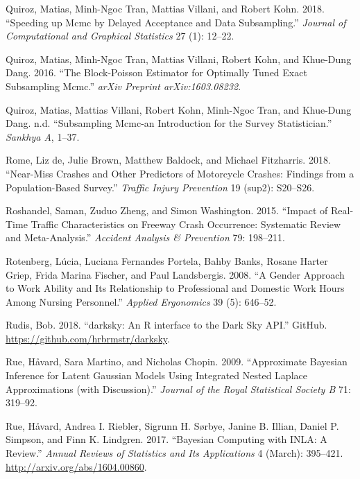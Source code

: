 \documentclass[12pt]{book}
\numberwithin{equation}{chapter}
\begin{document}
\leavevmode\hypertarget{ref-quiroz2018speeding}{}%
Quiroz, Matias, Minh-Ngoc Tran, Mattias Villani, and Robert Kohn. 2018. ``Speeding up Mcmc by Delayed Acceptance and Data Subsampling.'' \emph{Journal of Computational and Graphical Statistics} 27 (1): 12--22.

\leavevmode\hypertarget{ref-quiroz2016block}{}%
Quiroz, Matias, Minh-Ngoc Tran, Mattias Villani, Robert Kohn, and Khue-Dung Dang. 2016. ``The Block-Poisson Estimator for Optimally Tuned Exact Subsampling Mcmc.'' \emph{arXiv Preprint arXiv:1603.08232}.

\leavevmode\hypertarget{ref-quirozsubsampling}{}%
Quiroz, Matias, Mattias Villani, Robert Kohn, Minh-Ngoc Tran, and Khue-Dung Dang. n.d. ``Subsampling Mcmc-an Introduction for the Survey Statistician.'' \emph{Sankhya A}, 1--37.

\leavevmode\hypertarget{ref-de2018near}{}%
Rome, Liz de, Julie Brown, Matthew Baldock, and Michael Fitzharris. 2018. ``Near-Miss Crashes and Other Predictors of Motorcycle Crashes: Findings from a Population-Based Survey.'' \emph{Traffic Injury Prevention} 19 (sup2): S20--S26.

\leavevmode\hypertarget{ref-roshandel2015impact}{}%
Roshandel, Saman, Zuduo Zheng, and Simon Washington. 2015. ``Impact of Real-Time Traffic Characteristics on Freeway Crash Occurrence: Systematic Review and Meta-Analysis.'' \emph{Accident Analysis \& Prevention} 79: 198--211.

\leavevmode\hypertarget{ref-rotenberg2008gender}{}%
Rotenberg, Lúcia, Luciana Fernandes Portela, Bahby Banks, Rosane Harter Griep, Frida Marina Fischer, and Paul Landsbergis. 2008. ``A Gender Approach to Work Ability and Its Relationship to Professional and Domestic Work Hours Among Nursing Personnel.'' \emph{Applied Ergonomics} 39 (5): 646--52.

\leavevmode\hypertarget{ref-hrbrmstr}{}%
Rudis, Bob. 2018. ``darksky: An R interface to the Dark Sky API.'' GitHub. \url{https://github.com/hrbrmstr/darksky}.

\leavevmode\hypertarget{ref-Havard2009}{}%
Rue, Håvard, Sara Martino, and Nicholas Chopin. 2009. ``Approximate Bayesian Inference for Latent Gaussian Models Using Integrated Nested Laplace Approximations (with Discussion).'' \emph{Journal of the Royal Statistical Society B} 71: 319--92.

\leavevmode\hypertarget{ref-Rue2017}{}%
Rue, Håvard, Andrea I. Riebler, Sigrunn H. Sørbye, Janine B. Illian, Daniel P. Simpson, and Finn K. Lindgren. 2017. ``Bayesian Computing with INLA: A Review.'' \emph{Annual Reviews of Statistics and Its Applications} 4 (March): 395--421. \url{http://arxiv.org/abs/1604.00860}.
\end{document}
